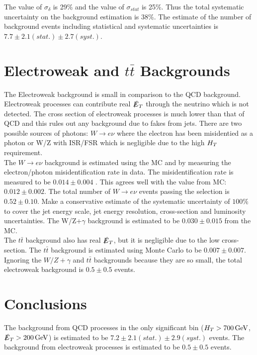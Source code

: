 The value of $\sigma_{\delta}$ is 29\unit{\%} and the value of $\sigma_{stat}$
is 25\unit{\%}. Thus the total systematic uncertainty on the background 
estimation is 38\unit{\%}. The estimate of the number of background events 
including statistical and systematic uncertainties is 
$7.7\pm2.1(stat.)\pm2.7(syst.)$.

\section{Electroweak and $t\bar{t}$ Backgrounds}

The Electroweak background is small in comparison to the QCD background.
Electroweak processes can contribute real $\slashed{E}_{T}$ through the neutrino which is 
not detected. The cross section of electroweak processes is much lower than
that of QCD and this rules out any background due to fakes from jets. There are
two possible sources of photons: $W\rightarrow e\nu$ where the electron has been
misidentied as a photon or W/Z with ISR/FSR which is negligible due to the high 
$H_{T}$ requirement. \\

The $W\rightarrow e\nu$ background is estimated using the MC and by measuring 
the electron/photon misidentification rate in data. The misidentification rate 
is measured to be $0.014\pm0.004$ \cite{ra3}. This agrees well with the value 
from MC: $0.012\pm0.002$. The total number of $W\rightarrow e\nu$ events passing 
the selection is $0.52\pm0.10$. Make a conservative estimate of the systematic 
uncertainty of $100\unit{\%}$ to cover the jet energy scale, jet energy 
resolution, cross-section and luminosity uncertainties. The W/Z+$\gamma$ 
background is estimated to be $0.030\pm0.015$ from the MC. \\

The $t\bar{t}$ background also has real $\slashed{E}_{T}$, but it is negligible due to the
low cross-section. The $t\bar{t}$ background is estimated using Monte Carlo to
be $0.007\pm0.007$. \\

Ignoring the $W/Z+\gamma$ and $t\bar{t}$ backgrounds because they are so small, 
the total electroweak background is $0.5\pm0.5$ events.
 
\section{Conclusions}

The background from QCD processes in the only significant bin
($H_{T}>700\, \mathrm{GeV}$, $\slashed{E}_{T}>200\, \mathrm{GeV}$) is estimated to be 
$7.2\pm2.1(stat.)\pm2.9(syst.)$ events. The background from electroweak
processes is estimated to be $0.5\pm0.5$ events.
